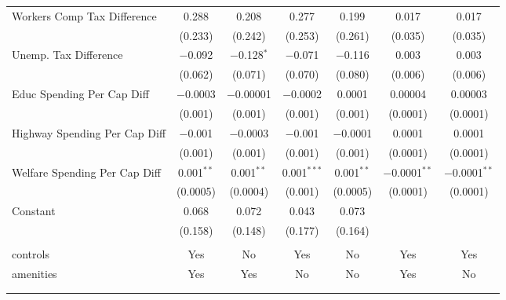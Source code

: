 \begin{table}[!htbp]
\begin{tabular}{@{\extracolsep{5pt}}lcccccc}
  Workers Comp Tax Difference & 0.288 & 0.208 & 0.277 & 0.199 & 0.017 & 0.017 \\ 
  & (0.233) & (0.242) & (0.253) & (0.261) & (0.035) & (0.035) \\ 
  Unemp. Tax Difference & $-$0.092 & $-$0.128$^{*}$ & $-$0.071 & $-$0.116 & 0.003 & 0.003 \\ 
  & (0.062) & (0.071) & (0.070) & (0.080) & (0.006) & (0.006) \\ 
  Educ Spending Per Cap Diff & $-$0.0003 & $-$0.00001 & $-$0.0002 & 0.0001 & 0.00004 & 0.00003 \\ 
  & (0.001) & (0.001) & (0.001) & (0.001) & (0.0001) & (0.0001) \\ 
  Highway Spending Per Cap Diff & $-$0.001 & $-$0.0003 & $-$0.001 & $-$0.0001 & 0.0001 & 0.0001 \\ 
  & (0.001) & (0.001) & (0.001) & (0.001) & (0.0001) & (0.0001) \\ 
  Welfare Spending Per Cap Diff & 0.001$^{**}$ & 0.001$^{**}$ & 0.001$^{***}$ & 0.001$^{**}$ & $-$0.0001$^{**}$ & $-$0.0001$^{**}$ \\ 
  & (0.0005) & (0.0004) & (0.001) & (0.0005) & (0.0001) & (0.0001) \\ 
  Constant & 0.068 & 0.072 & 0.043 & 0.073 &  &  \\ 
  & (0.158) & (0.148) & (0.177) & (0.164) &  &  \\ 
 \hline \\[-1.8ex] 
controls & Yes & No & Yes & No & Yes & Yes \\ 
amenities & Yes & Yes & No & No & Yes & No \\ 
\hline \\[-1.8ex] 
\hline 
\hline \\[-1.8ex] 
\end{tabular} 
\end{table} 
